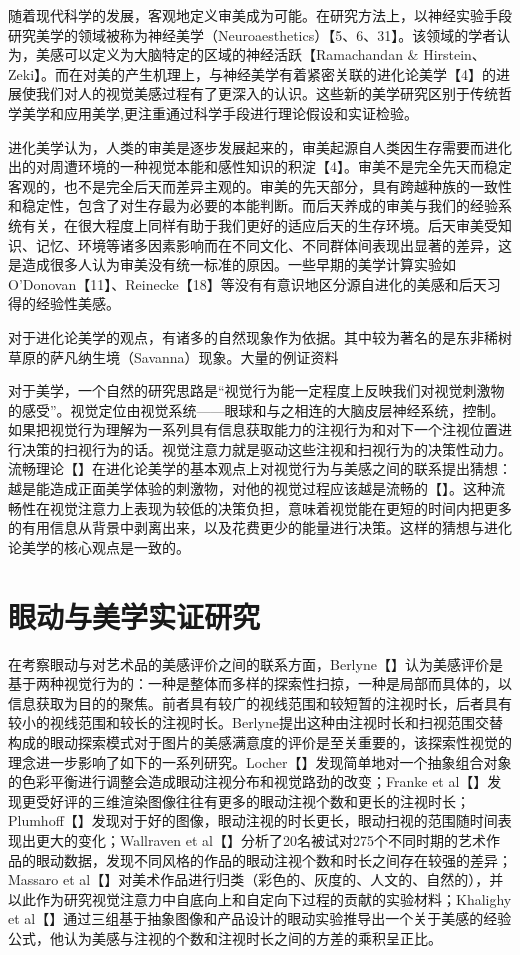 随着现代科学的发展，客观地定义审美成为可能。在研究方法上，以神经实验手段研究美学的领域被称为神经美学（Neuroaesthetics）【5、6、31】。该领域的学者认为，美感可以定义为大脑特定的区域的神经活跃【Ramachandan \& Hirstein、Zeki】。而在对美的产生机理上，与神经美学有着紧密关联的进化论美学【4】的进展使我们对人的视觉美感过程有了更深入的认识。这些新的美学研究区别于传统哲学美学和应用美学,更注重通过科学手段进行理论假设和实证检验。

进化美学认为，人类的审美是逐步发展起来的，审美起源自人类因生存需要而进化出的对周遭环境的一种视觉本能和感性知识的积淀【4】。审美不是完全先天而稳定客观的，也不是完全后天而差异主观的。审美的先天部分，具有跨越种族的一致性和稳定性，包含了对生存最为必要的本能判断。而后天养成的审美与我们的经验系统有关，在很大程度上同样有助于我们更好的适应后天的生存环境。后天审美受知识、记忆、环境等诸多因素影响而在不同文化、不同群体间表现出显著的差异，这是造成很多人认为审美没有统一标准的原因。一些早期的美学计算实验如O’Donovan【11】、Reinecke【18】等没有有意识地区分源自进化的美感和后天习得的经验性美感。

对于进化论美学的观点，有诸多的自然现象作为依据。其中较为著名的是东非稀树草原的萨凡纳生境（Savanna）现象。大量的例证资料

对于美学，一个自然的研究思路是“视觉行为能一定程度上反映我们对视觉刺激物的感受”。视觉定位由视觉系统——眼球和与之相连的大脑皮层神经系统，控制。如果把视觉行为理解为一系列具有信息获取能力的注视行为和对下一个注视位置进行决策的扫视行为的话。视觉注意力就是驱动这些注视和扫视行为的决策性动力。流畅理论【】在进化论美学的基本观点上对视觉行为与美感之间的联系提出猜想：越是能造成正面美学体验的刺激物，对他的视觉过程应该越是流畅的【】。这种流畅性在视觉注意力上表现为较低的决策负担，意味着视觉能在更短的时间内把更多的有用信息从背景中剥离出来，以及花费更少的能量进行决策。这样的猜想与进化论美学的核心观点是一致的。

\section{眼动与美学实证研究}

在考察眼动与对艺术品的美感评价之间的联系方面，Berlyne【】认为美感评价是基于两种视觉行为的：一种是整体而多样的探索性扫掠，一种是局部而具体的，以信息获取为目的的聚焦。前者具有较广的视线范围和较短暂的注视时长，后者具有较小的视线范围和较长的注视时长。Berlyne提出这种由注视时长和扫视范围交替构成的眼动探索模式对于图片的美感满意度的评价是至关重要的，该探索性视觉的理念进一步影响了如下的一系列研究。Locher【】发现简单地对一个抽象组合对象的色彩平衡进行调整会造成眼动注视分布和视觉路劲的改变；Franke et al【】发现更受好评的三维渲染图像往往有更多的眼动注视个数和更长的注视时长；Plumhoff【】发现对于好的图像，眼动注视的时长更长，眼动扫视的范围随时间表现出更大的变化；Wallraven et al【】分析了20名被试对275个不同时期的艺术作品的眼动数据，发现不同风格的作品的眼动注视个数和时长之间存在较强的差异；Massaro et al【】对美术作品进行归类（彩色的、灰度的、人文的、自然的），并以此作为研究视觉注意力中自底向上和自定向下过程的贡献的实验材料；Khalighy et al【】通过三组基于抽象图像和产品设计的眼动实验推导出一个关于美感的经验公式，他认为美感与注视的个数和注视时长之间的方差的乘积呈正比。

